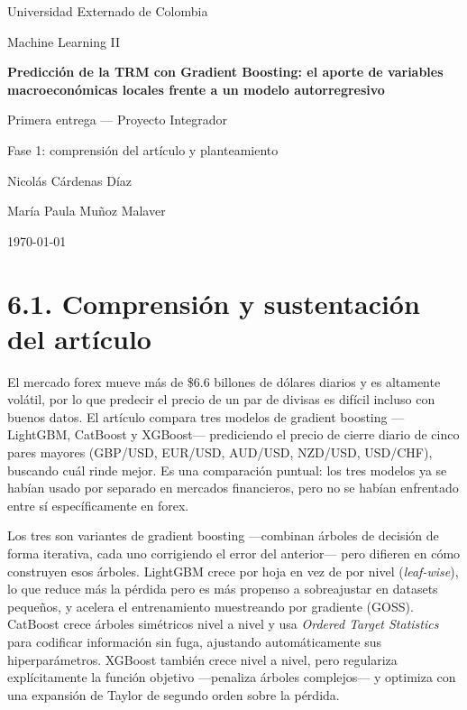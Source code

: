 \documentclass[11pt,letterpaper]{article}
\newcommand{\tituloproyecto}{Predicción de la TRM con Gradient Boosting: el aporte de variables macroeconómicas locales frente a un modelo autorregresivo}
\newcommand{\integranteuno}{Nicolás Cárdenas Díaz}
\newcommand{\integrantedos}{María Paula Muñoz Malaver}
\begin{document}
  \begin{titlepage}
  \centering
  \vspace*{1.5cm}

  {\large Universidad Externado de Colombia\par}
  {\large Machine Learning II\par}

  \vspace{2.5cm}

  {\Large \textbf{\tituloproyecto}\par}

  \vspace{1cm}

  {\large Primera entrega --- Proyecto Integrador\par}
  {\large Fase 1: comprensión del artículo y planteamiento\par}

  \vspace{2.5cm}

  {\large \integranteuno \par}
  {\large \integrantedos \par}

  \vfill

  {\large \today\par}

  \end{titlepage}


  \section*{6.1. Comprensión y sustentación del artículo}

  El mercado forex mueve más de \$6.6 billones de dólares diarios y es altamente volátil, por lo que predecir el precio de un par de divisas es difícil incluso con buenos datos. El artículo compara tres modelos de gradient boosting ---LightGBM, CatBoost y XGBoost--- prediciendo el precio de cierre diario de cinco pares mayores (GBP/USD, EUR/USD, AUD/USD, NZD/USD, USD/CHF), buscando cuál rinde mejor. Es una comparación puntual: los tres modelos ya se habían usado por separado en mercados financieros, pero no se habían enfrentado entre sí específicamente en forex.

  Los tres son variantes de gradient boosting ---combinan árboles de decisión de forma iterativa, cada uno corrigiendo el error del anterior--- pero difieren en cómo construyen esos árboles. LightGBM crece por hoja en vez de por nivel (\textit{leaf-wise}), lo que reduce más la pérdida pero es más propenso a sobreajustar en datasets pequeños, y acelera el entrenamiento muestreando por gradiente (GOSS). CatBoost crece árboles simétricos nivel a nivel y usa \textit{Ordered Target Statistics} para codificar información sin fuga, ajustando automáticamente sus hiperparámetros. XGBoost también crece nivel a nivel, pero regulariza explícitamente la función objetivo ---penaliza árboles complejos--- y optimiza con una expansión de Taylor de segundo orden sobre la pérdida.
\end{document}
